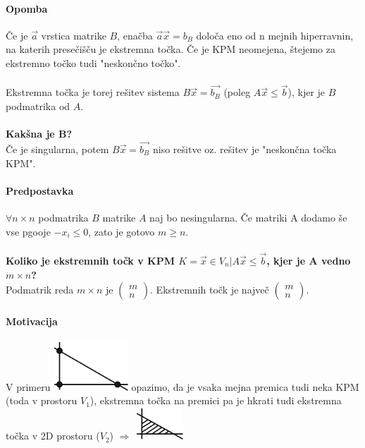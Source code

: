 \documentclass[a4paper,10pt]{article}
\begin{document}
\paragraph{Opomba}
\v Ce je $\vec a$ vrstica matrike $B$, ena\v cba $\vec{a} \vec{x} = b_B$ dolo\v ca eno od n mejnih hiperravnin, na katerih prese\v ci\v s\v cu je ekstremna to\v cka. \v Ce je KPM neomejena, \v stejemo za ekstremno to\v cko tudi "neskon\v cno to\v cko".\\
\\
Ekstremna to\v cka je torej re\v sitev sistema $B \vec x = \vec{b_B}$ (poleg $A \vec x \leq \vec b$), kjer je $B$ podmatrika od $A$.\\
\\
\textbf{Kak\v sna je B?}\\
\v Ce je singularna, potem $B \vec x = \vec{b_B}$ niso re\v sitve oz. re\v sitev je "neskon\v cna to\v cka KPM".

\paragraph{Predpostavka}
$\forall n \times n$ podmatrika $B$ matrike $A$ naj bo nesingularna. \v Ce matriki A dodamo \v se vse pgooje $-x_i \leq 0$, zato je gotovo $m \geq n$.\\
\\
\textbf{Koliko je ekstremnih to\v ck v KPM $K = {\vec x \in V_n | A \vec x \leq \vec b}$, kjer je A vedno $m \times n$?}\\
Podmatrik reda $m \times n$ je 
$
\left (
\begin{array}{c}
m\\
n
\end{array}
\right)
$.
Ekstremnih to\v ck je najve\v c 
$
\left (
\begin{array}{c}
m\\
n
\end{array}
\right)
$.

\paragraph{Motivacija}
V primeru 
	\includegraphics[width=2.8cm,height=1.85cm]{Slike/EkstremneTockeMotivacija.png}
opazimo, da je vsaka mejna premica tudi neka KPM (toda v prostoru $V_1$), ekstremna to\v cka na premici pa je hkrati tudi ekstremna to\v cka v 2D prostoru ($V_2$) $\Rightarrow$
	\includegraphics[width=1.8cm,height=1.2cm]{Slike/EkstremneTockeMotivacija2.png}
\end{document}

